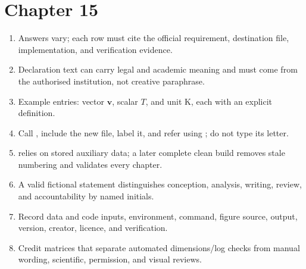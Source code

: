 \section*{Chapter 15}
\begin{enumerate}[label=15.\arabic*,leftmargin=2.4em,itemsep=0.45em]
  \item Answers vary; each row must cite the official requirement, destination
        file, implementation, and verification evidence.
  \item Declaration text can carry legal and academic meaning and must come from
        the authorised institution, not creative paraphrase.
  \item Example entries: vector $\mathbf v$, scalar $T$, and unit
        \unit{\kelvin}, each with an explicit definition.
  \item Call , include the new file, label it, and refer using
        ; do not type its letter.
  \item {} relies on stored auxiliary data; a later complete clean
        build removes stale numbering and validates every chapter.
  \item A valid fictional statement distinguishes conception, analysis, writing,
        review, and accountability by named initials.
  \item Record data and code inputs, environment, command, figure source, output,
        version, creator, licence, and verification.
  \item Credit matrices that separate automated dimensions/log checks from
        manual wording, scientific, permission, and visual reviews.
\end{enumerate}

